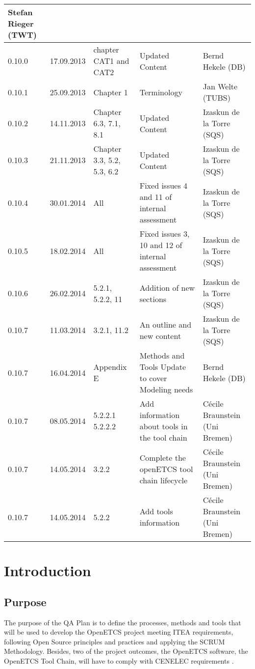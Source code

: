 \documentclass{template/openetcs_article}
\begin{document}
\begin{center}
\begin{longtable}{m{1.1cm}m{1.8cm}m{2cm}m{5cm}m{4cm}}
Stefan Rieger (TWT)\\\hline
0.10.0 &
17.09.2013 &
chapter CAT1 and CAT2 &
Updated Content  &
Bernd Hekele (DB)
\\\hline
0.10.1 &
25.09.2013 &
Chapter 1 &
Terminology &
Jan Welte (TUBS)
\\\hline
0.10.2 &
14.11.2013 &
Chapter 6.3, 7.1, 8.1 &
Updated Content &
Izaskun de la Torre (SQS)
\\\hline
0.10.3 &
21.11.2013 &
Chapter 3.3, 5.2, 5.3, 6.2 &
Updated Content &
Izaskun de la Torre (SQS)
\\\hline
0.10.4 &
30.01.2014 &
All &
Fixed issues 4 and 11 of internal assessment &
Izaskun de la Torre (SQS)
\\\hline
0.10.5 &
18.02.2014 &
All &
Fixed issues 3, 10 and 12 of internal assessment &
Izaskun de la Torre (SQS)
\\\hline
0.10.6 &
26.02.2014 &
5.2.1, 5.2.2, 11 &
Addition of new sections &
Izaskun de la Torre (SQS)
\\\hline
0.10.7 &
11.03.2014 &
3.2.1, 11.2 &
An outline and new content &
Izaskun de la Torre (SQS)
\\\hline
0.10.7 &
16.04.2014 &
Appendix E &
Methods and Tools Update to cover Modeling needs &
Bernd Hekele (DB)
\\\hline
0.10.7 &
08.05.2014 &
5.2.2.1 5.2.2.2 &
Add information about tools in the tool chain &
C\'ecile Braunstein (Uni Bremen)
\\\hline
0.10.7 &
14.05.2014 &
3.2.2 &
Complete the  openETCS tool chain lifecycle &
C\'ecile Braunstein (Uni Bremen)
\\\hline
0.10.7 &
14.05.2014 &
5.2.2 &
Add tools information &
C\'ecile Braunstein (Uni Bremen)

\end{longtable}
\end{center}


\newpage



\section[Introduction]{Introduction}


\subsection{Purpose}

The purpose of the QA Plan is to define the processes, methods and tools that will be used to develop the OpenETCS project meeting ITEA requirements, following Open Source principles and practices and applying the SCRUM Methodology. Besides, two of the project outcomes, the OpenETCS software, the OpenETCS Tool Chain, will have to comply with CENELEC requirements \citep{EN50128}.
\end{document}
